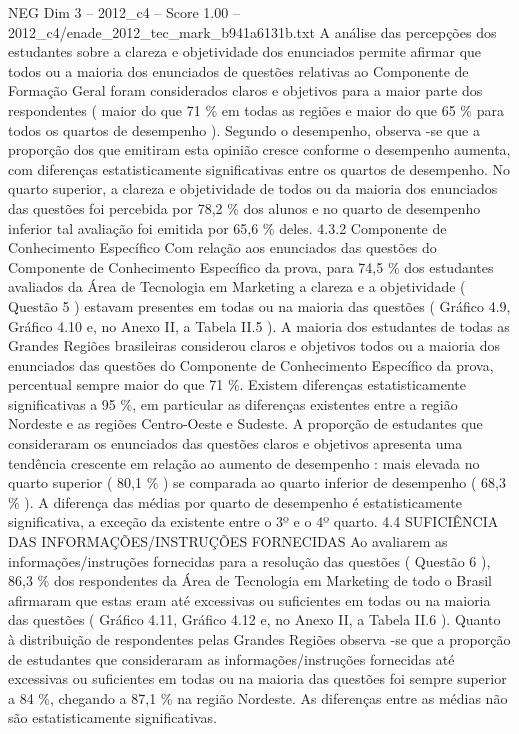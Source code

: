 \begin{textsample}{NEG Dim 3 – 2012\_c4 – Score 1.00 – 2012\_c4/enade\_2012\_tec\_mark\_b941a6131b.txt}
A análise das percepções dos estudantes sobre a clareza e objetividade dos enunciados permite afirmar que todos ou a maioria dos enunciados de questões relativas ao Componente de Formação Geral foram considerados claros e objetivos para a maior parte dos respondentes ( maior do que 71 \% em todas as regiões e maior do que 65 \% para todos os quartos de desempenho ).
Segundo o desempenho, observa -se que a proporção dos que emitiram esta opinião cresce conforme o desempenho aumenta, com diferenças estatisticamente significativas entre os quartos de desempenho.
No quarto superior, a clareza e objetividade de todos ou da maioria dos enunciados das questões foi percebida por 78,2 \% dos alunos e no quarto de desempenho inferior tal avaliação foi emitida por 65,6 \% deles. 4.3.2 Componente de Conhecimento Específico Com relação aos enunciados das questões do Componente de Conhecimento Específico da prova, para 74,5 \% dos estudantes avaliados da Área de Tecnologia em Marketing a clareza e a objetividade ( Questão 5 ) estavam presentes em todas ou na maioria das questões ( Gráfico 4.9, Gráfico 4.10 e, no Anexo II, a Tabela II.5 ).
A maioria dos estudantes de todas as Grandes Regiões brasileiras considerou claros e objetivos todos ou a maioria dos enunciados das questões do Componente de Conhecimento Específico da prova, percentual sempre maior do que 71 \%.
Existem diferenças estatisticamente significativas a 95 \%, em particular as diferenças existentes entre a região Nordeste e as regiões Centro-Oeste e Sudeste.
A proporção de estudantes que consideraram os enunciados das questões claros e objetivos apresenta uma tendência crescente em relação ao aumento de desempenho : mais elevada no quarto superior ( 80,1 \% ) se comparada ao quarto inferior de desempenho ( 68,3 \% ).
A diferença das médias por quarto de desempenho é estatisticamente significativa, a exceção da existente entre o 3º e o 4º quarto. 4.4 SUFICIÊNCIA DAS INFORMAÇÕES/INSTRUÇÕES FORNECIDAS Ao avaliarem as informações/instruções fornecidas para a resolução das questões ( Questão 6 ), 86,3 \% dos respondentes da Área de Tecnologia em Marketing de todo o Brasil afirmaram que estas eram até excessivas ou suficientes em todas ou na maioria das questões ( Gráfico 4.11, Gráfico 4.12 e, no Anexo II, a Tabela II.6 ).
Quanto à distribuição de respondentes pelas Grandes Regiões observa -se que a proporção de estudantes que consideraram as informações/instruções fornecidas até excessivas ou suficientes em todas ou na maioria das questões foi sempre superior a 84 \%, chegando a 87,1 \% na região Nordeste.
As diferenças entre as médias não são estatisticamente significativas.

\end{textsample}
